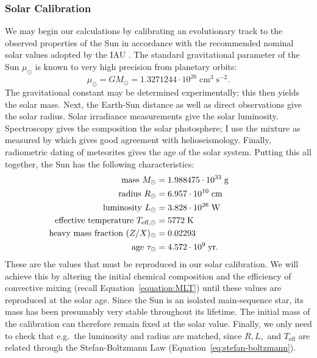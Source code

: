 \subsubsection*{Solar Calibration}
\label{sec:calibration}

We may begin our calculations by calibrating an evolutionary track to the observed properties of the Sun \citep[e.g.][]{1982MNRAS.199..735C} in accordance with the recommended nominal solar values adopted by the IAU \citep{2015arXiv151007674M}. 
The standard gravitational parameter of the Sun $\mu_\odot$ is known to very high precision from planetary orbits: 
\begin{equation*}
    \mu_\odot = GM_\odot = 1.3271244 \cdot 10^{26} \; \text{cm}^3 \; \text{s}^{-2}.
\end{equation*}
The gravitational constant may be determined experimentally; this then yields the solar mass. 
Next, the Earth-Sun distance as well as direct observations give the solar radius. 
Solar irradiance measurements give the solar luminosity. 
Spectroscopy gives the composition the solar photosphere; I use the mixture as measured by \citet[][hereinafter \textsc{GS98}]{1998SSRv...85..161G} which gives good agreement with helioseismology. 
Finally, radiometric dating of meteorites gives the age of the solar system. 
Putting this all together, the Sun has the following characteristics: 
\begin{equation} \label{eq:solar-vals}
\begin{aligned}
    \text{mass } M_\odot &= 1.988475 \cdot 10^{33}\; \text{g} \\
    \text{radius } R_\odot &= 6.957 \cdot 10^{10}\; \text{cm} \\
    \text{luminosity } L_\odot &= 3.828 \cdot 10^{26}\; \text{W} \\
    \makebox[0pt][r]{\text{effective }}\text{temperature } T_{\text{eff},\odot} &= 5772\; \text{K} \\
    \makebox[0pt][r]{\text{heavy mass fraction }} (Z/X)_\odot &= 0.02293 \\
    \text{age } \tau_\odot &= 4.572\cdot 10^{9} \; \text{yr}.
\end{aligned}
\end{equation}
These are the values that must be reproduced in our solar calibration. 
We will achieve this by altering the initial chemical composition and the efficiency of convective mixing (recall Equation~\ref{equation:MLT}) until these values are reproduced at the solar age. 
Since the Sun is an isolated main-sequence star, its mass has been presumably very stable throughout its lifetime. 
The initial mass of the calibration can therefore remain fixed at the solar value. 
Finally, we only need to check that e.g.~the luminosity and radius are matched, since $R, L,$ and $T_{\text{eff}}$ are related through the Stefan-Boltzmann Law (Equation~\ref{eq:stefan-boltzmann}).

